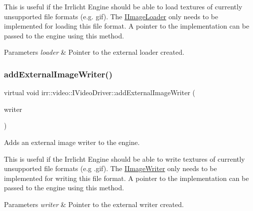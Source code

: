 This is useful if the Irrlicht Engine should be able to load textures of currently unsupported file formats (e.\+g. gif). The \hyperlink{classirr_1_1video_1_1IImageLoader}{I\+Image\+Loader} only needs to be implemented for loading this file format. A pointer to the implementation can be passed to the engine using this method. 
\begin{DoxyParams}{Parameters}
{\em loader} & Pointer to the external loader created. \\
\hline
\end{DoxyParams}
\mbox{\label{classirr_1_1video_1_1IVideoDriver_a56160e0d88346e04db921fbe4635a7ae}} 
\subsubsection{\texorpdfstring{add\+External\+Image\+Writer()}{addExternalImageWriter()}}
{\footnotesize\ttfamily virtual void irr\+::video\+::\+I\+Video\+Driver\+::add\+External\+Image\+Writer (\begin{DoxyParamCaption}\item[{\hyperlink{classirr_1_1video_1_1IImageWriter}{I\+Image\+Writer} $\ast$}]{writer }\end{DoxyParamCaption})\hspace{0.3cm}{\ttfamily [pure virtual]}}



Adds an external image writer to the engine. 

This is useful if the Irrlicht Engine should be able to write textures of currently unsupported file formats (e.\+g .gif). The \hyperlink{classirr_1_1video_1_1IImageWriter}{I\+Image\+Writer} only needs to be implemented for writing this file format. A pointer to the implementation can be passed to the engine using this method. 
\begin{DoxyParams}{Parameters}
{\em writer} & Pointer to the external writer created. \\
\hline
\end{DoxyParams}
\mbox{\label{classirr_1_1video_1_1IVideoDriver_a0dfc3a7168f3a73a6f4323b579f03ff6}} 
